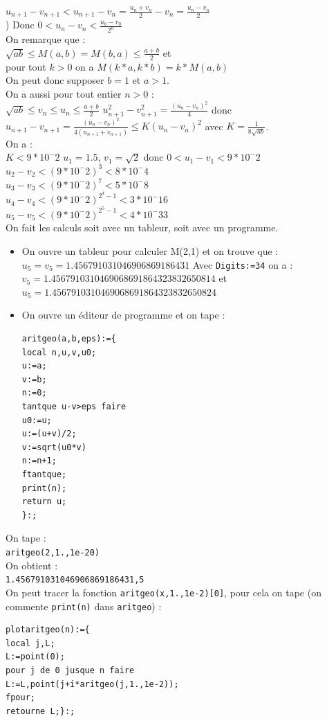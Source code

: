 \documentclass[a4paper,11pt]{book}
\begin{document}
$\displaystyle u_{n+1}-v_{n+1}<u_{n+1}-v_n=\frac{u_n+v_n}{2}-v_n=\frac{u_n-v_n}{2}$\\)
Donc $0<u_n-v_n<\frac{u_0-v_0}{2^n}$\\
On remarque que :\\
$\sqrt{ab}\leq M(a,b)=M(b,a)\leq \frac{a+b}{2}$ et\\
pour tout $k>0$ on a $M(k*a,k*b)=k*M(a,b)$\\
On peut donc supposer $b=1$ et $a>1$.\\
On a aussi pour tout entier $n>0$ :\\
$ \sqrt{ab}\leq v_n\leq u_n \leq \frac{a+b}{2}$
$u_{n+1}^2-v_{n+1}^2=\frac{(u_n-v_n)^2}{4}$ donc \\
$u_{n+1}-v_{n+1}=\frac{(u_n-v_n)^2}{4(u_{n+1}+v_{n+1})}\leq K(u_n-v_n)^2$ avec 
$K=\frac{1}{8\sqrt{ab}}$.\\
On a :\\
$K<9*10^-2$
$u_1=1.5$, $v_1=\sqrt 2$ donc $0<u_1-v_1< 9*10^-2$\\
$u_2-v_2<(9*10^-2)^3<8*10^-4$\\
$u_3-v_3<(9*10^-2)^7<5*10^-8$\\
$u_4-v_4<(9*10^-2)^{2^4-1}<3*10^-{16}$\\
$u_5-v_5<(9*10^-2)^{2^5-1}<4*10^-{33}$\\
On fait les calculs soit avec un tableur, soit avec un programme.
\begin{itemize} 
\item On ouvre un tableur pour calculer M(2,1) et on trouve que :
$u_5=v_5=1.456791031046906869186431$
Avec {\tt Digits:=34} on a :\\
$v_5=1.4567910310469068691864323832650814$ et \\
$u_5=1.4567910310469068691864323832650824$
\item On ouvre un \'editeur de programme et on tape :
\begin{verbatim} 
aritgeo(a,b,eps):={
local n,u,v,u0;
u:=a;
v:=b;
n:=0;
tantque u-v>eps faire
u0:=u;
u:=(u+v)/2;
v:=sqrt(u0*v)
n:=n+1;
ftantque;
print(n);
return u;
}:;
\end{verbatim}
\end{itemize} 
On tape :\\
{\tt aritgeo(2,1.,1e-20)}\\
On obtient :\\
{\tt 1.456791031046906869186431,5}\\
On peut tracer la fonction {\tt aritgeo(x,1.,1e-2)[0]}, pour cela on tape (on 
commente {\tt print(n)} dans {\tt aritgeo}) :
\begin{verbatim} 
plotaritgeo(n):={
local j,L;
L:=point(0);
pour j de 0 jusque n faire
L:=L,point(j+i*aritgeo(j,1.,1e-2));
fpour;
retourne L;}:;
\end{verbatim}
\end{document}
